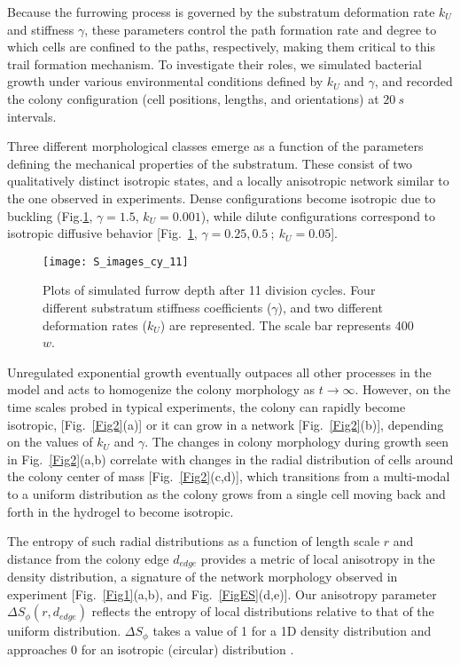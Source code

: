 \documentclass[aps,prl,numerical,reprint,superscriptaddress,showpacs]{revtex4-1}
\begin{document}
Because the furrowing process is governed by the substratum deformation rate $k_U$ and stiffness $\gamma$, these parameters control the path formation rate and degree to which cells are confined to the paths, respectively, making them critical to this trail formation mechanism. To investigate their roles, we simulated bacterial growth under various environmental conditions defined by $k_U$ and $\gamma$, and recorded the colony configuration (cell positions, lengths, and orientations) at $20~s$ intervals.

Three different morphological classes emerge as a function of the parameters defining the mechanical properties of the substratum. These consist of two qualitatively distinct isotropic states, and a locally anisotropic network similar to the one observed in experiments. Dense configurations become isotropic due to buckling \cite{boyer2011buckling} (Fig.\ref{Fig3}, $\gamma = 1.5$, $k_U = 0.001$), while dilute configurations correspond to isotropic diffusive behavior [Fig.~\ref{Fig3}, $\gamma = 0.25, 0.5 ~;~k_U = 0.05$]. 

\begin{figure}[h]
\centering
{\texttt{[image: S\_images\_cy\_11]}}
\caption{Plots of simulated furrow depth after 11 division cycles. Four different substratum stiffness coefficients ($\gamma$), and two different deformation rates ($k_{U}$) are represented. The scale bar represents 400 $w$.}
\label{Fig3}
\end{figure}


Unregulated exponential growth eventually outpaces all other processes in the model and acts to homogenize the colony morphology as $t\rightarrow\infty$. However, on the time scales probed in typical experiments, the colony can rapidly become isotropic,  [Fig.~\ref{Fig2}(a)] or it can grow in a network [Fig.~\ref{Fig2}(b)], depending on the values of $k_U$ and $\gamma$. The changes in colony morphology during growth seen in Fig.~\ref{Fig2}(a,b) correlate with changes in the radial distribution of cells around the colony center of mass [Fig.~\ref{Fig2}(c,d)], which transitions from a multi-modal to a uniform distribution as the colony grows from a single cell moving back and forth  in the hydrogel to become isotropic. 

The entropy of such radial distributions as a function of length scale $r$ and distance from the colony edge $d_{edge}$ provides a metric of local anisotropy in the density distribution, a signature of the network morphology observed in experiment [Fig.~\ref{Fig1}(a,b), and Fig.~\ref{FigES}(d,e)]. Our anisotropy parameter $\Delta S_{\phi}(r, d_{edge})$ reflects the entropy of local distributions relative to that of the uniform distribution. $\Delta S_{\phi}$ takes a value of 1 for a 1D density distribution and approaches 0 for an isotropic (circular) distribution \cite{Supp}. 
\end{document}
